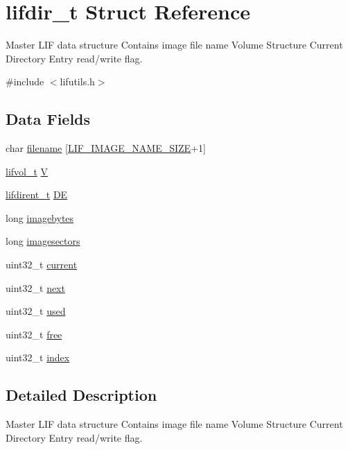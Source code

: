 \hypertarget{structlifdir__t}{}\section{lifdir\+\_\+t Struct Reference}
\label{structlifdir__t}


Master L\+IF data structure Contains image file name Volume Structure Current Directory Entry read/write flag.  




{\ttfamily \#include $<$lifutils.\+h$>$}

\subsection*{Data Fields}
\begin{DoxyCompactItemize}
\item 
char \hyperlink{structlifdir__t_a21bfa7a6d54009982cc63962951ba615}{filename} \mbox{[}\hyperlink{lifutils_8h_a8cfa79b094fc3a5db37b26761a639e6d}{L\+I\+F\+\_\+\+I\+M\+A\+G\+E\+\_\+\+N\+A\+M\+E\+\_\+\+S\+I\+ZE}+1\mbox{]}
\item 
\hyperlink{structlifvol__t}{lifvol\+\_\+t} \hyperlink{structlifdir__t_a6d9cb52ec6e3ff579ca3f45db9176ce9}{V}
\item 
\hyperlink{structlifdirent__t}{lifdirent\+\_\+t} \hyperlink{structlifdir__t_af9247c1579ce3fe0c57db9fd6b56c232}{DE}
\item 
long \hyperlink{structlifdir__t_a17f59e8c3d17643205266afda1fc07e4}{imagebytes}
\item 
long \hyperlink{structlifdir__t_a142bc82acfe24a55318aeb19f7ae9e8e}{imagesectors}
\item 
uint32\+\_\+t \hyperlink{structlifdir__t_ae885e86a62d50c5b0c99ad2b63120e2c}{current}
\item 
uint32\+\_\+t \hyperlink{structlifdir__t_a0e0b720a376eb3d13f551626606f46a7}{next}
\item 
uint32\+\_\+t \hyperlink{structlifdir__t_a70e5c34e0a4be7af60ee5871c45c28df}{used}
\item 
uint32\+\_\+t \hyperlink{structlifdir__t_a502d704fe63e12080538e415ef3af68e}{free}
\item 
uint32\+\_\+t \hyperlink{structlifdir__t_a024aa12f9725f9f28875354c16e13d6b}{index}
\end{DoxyCompactItemize}


\subsection{Detailed Description}
Master L\+IF data structure Contains image file name Volume Structure Current Directory Entry read/write flag. 

